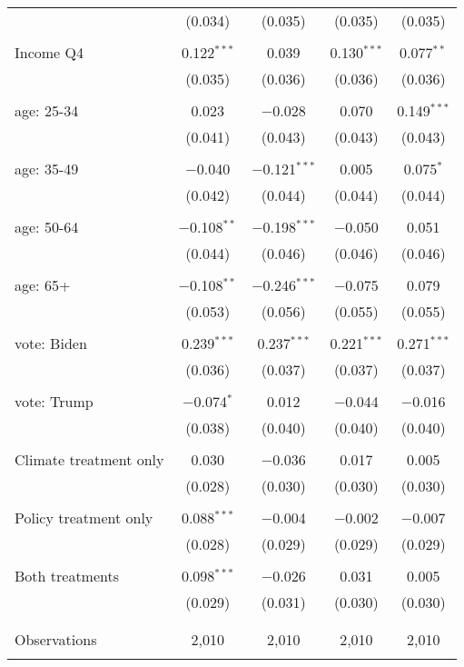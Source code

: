 \begin{tabular}{@{\extracolsep{5pt}}lcccc}
  & (0.034) & (0.035) & (0.035) & (0.035) \\ 
  & & & & \\ 
 Income Q4 & 0.122$^{***}$ & 0.039 & 0.130$^{***}$ & 0.077$^{**}$ \\ 
  & (0.035) & (0.036) & (0.036) & (0.036) \\ 
  & & & & \\ 
 age: 25-34 & 0.023 & $-$0.028 & 0.070 & 0.149$^{***}$ \\ 
  & (0.041) & (0.043) & (0.043) & (0.043) \\ 
  & & & & \\ 
 age: 35-49 & $-$0.040 & $-$0.121$^{***}$ & 0.005 & 0.075$^{*}$ \\ 
  & (0.042) & (0.044) & (0.044) & (0.044) \\ 
  & & & & \\ 
 age: 50-64 & $-$0.108$^{**}$ & $-$0.198$^{***}$ & $-$0.050 & 0.051 \\ 
  & (0.044) & (0.046) & (0.046) & (0.046) \\ 
  & & & & \\ 
 age: 65+ & $-$0.108$^{**}$ & $-$0.246$^{***}$ & $-$0.075 & 0.079 \\ 
  & (0.053) & (0.056) & (0.055) & (0.055) \\ 
  & & & & \\ 
 vote: Biden & 0.239$^{***}$ & 0.237$^{***}$ & 0.221$^{***}$ & 0.271$^{***}$ \\ 
  & (0.036) & (0.037) & (0.037) & (0.037) \\ 
  & & & & \\ 
 vote: Trump & $-$0.074$^{*}$ & 0.012 & $-$0.044 & $-$0.016 \\ 
  & (0.038) & (0.040) & (0.040) & (0.040) \\ 
  & & & & \\ 
 Climate treatment only & 0.030 & $-$0.036 & 0.017 & 0.005 \\ 
  & (0.028) & (0.030) & (0.030) & (0.030) \\ 
  & & & & \\ 
 Policy treatment only & 0.088$^{***}$ & $-$0.004 & $-$0.002 & $-$0.007 \\ 
  & (0.028) & (0.029) & (0.029) & (0.029) \\ 
  & & & & \\ 
 Both treatments & 0.098$^{***}$ & $-$0.026 & 0.031 & 0.005 \\ 
  & (0.029) & (0.031) & (0.030) & (0.030) \\ 
  & & & & \\ 
\hline \\[-1.8ex] 

Observations & 2,010 & 2,010 & 2,010 & 2,010 \\ 
\hline 
\hline \\[-1.8ex] 
\end{tabular} 